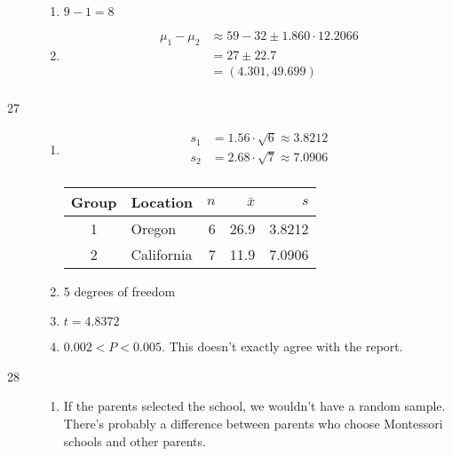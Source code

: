 \documentclass[letterpaper, landscape]{exam}
\begin{document}
\begin{description}
\begin{enumerate}[label = {(\alph*)}]
          \item $9 - 1 = 8$

          \item 
            \begin{align*}
              \mu_1 - \mu_2 & \approx 59 - 32 \pm 1.860 \cdot 12.2066 \\
                            & = \boxed{ 27 \pm 22.7 } \\
                            & = \boxed{ (4.301, 49.699) } \\
            \end{align*}

        \end{enumerate}

      \item[27]
        \begin{enumerate}[label = {(\alph*)}]
          \item 
            \begin{align*}
              s_1 &= 1.56 \cdot \sqrt{6} \approx 3.8212 \\
              s_2 &= 2.68 \cdot \sqrt{7} \approx 7.0906 \\
            \end{align*}

            \begin{tabular}[ht]{clrrr}
              \toprule
              Group & Location   & $n$ & $\bar{x}$ & $s$ \\
              \midrule
              1     & Oregon     & 6   & 26.9      & 3.8212 \\
              2     & California & 7   & 11.9      & 7.0906 \\
              \bottomrule
            \end{tabular}

          \item 5 degrees of freedom

          \item $t = 4.8372$
            
          \item $0.002 < P < 0.005$. This doesn't exactly agree with the report.

        \end{enumerate}

      \item[28]
        \begin{enumerate}[label = {(\alph*)}]
          \item If the parents selected the school, we wouldn't have a random
            sample. There's probably a difference between parents who choose
            Montessori schools and other parents.


\end{enumerate}
\end{description}
\end{document}
